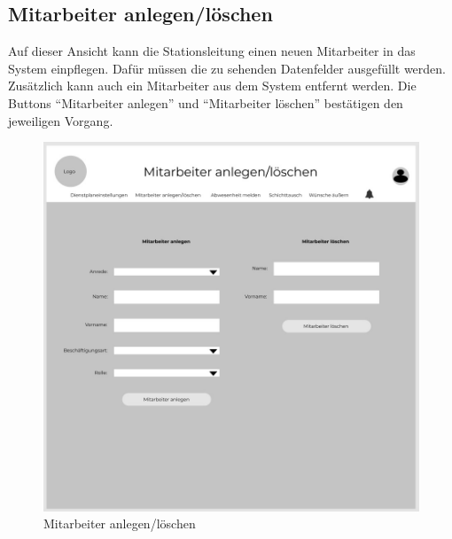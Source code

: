 \documentclass[11pt,
paper=a4,
bibtotocnumbered,	  %
liststotocnumbered,  %
DIV=calc,		  %
tablecaptionabove,	  %
headinclude,
]{article}
\begin{document}
\subsection{Mitarbeiter anlegen/löschen}
Auf dieser Ansicht kann die Stationsleitung einen neuen Mitarbeiter in das System einpflegen. Dafür müssen die zu sehenden Datenfelder ausgefüllt werden. Zusätzlich kann auch ein Mitarbeiter aus dem System entfernt werden. Die Buttons “Mitarbeiter anlegen” und “Mitarbeiter löschen” bestätigen den jeweiligen Vorgang.
\begin{figure}[H]
\includegraphics[width=1\textwidth]{Bilder/Mitarbeiteranlegen_loeschen.jpg}
\caption{Mitarbeiter anlegen/löschen}
\end{figure}
\end{document}

